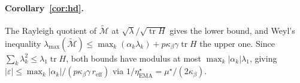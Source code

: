 \documentclass[11pt]{article}
\newcommand{\tr}{\operatorname{tr}}
\begin{document}
\paragraph{Corollary~\ref{cor:hd}.} The Rayleigh quotient of $\widetilde{\mathcal M}$ at $\sqrt\lambda/\sqrt{\tr H}$ gives the lower bound, and Weyl's inequality $\lambda_{\max}(\widetilde{\mathcal M})\le\max_k(\alpha_k\lambda_k)+p\kappa_\beta\gamma\tr H$ the upper one. Since $\sum_k\lambda_k^2\le\lambda_1\tr H$, both bounds have modulus at most $\max_k|\alpha_k|\lambda_1$, giving $|\varepsilon|\le\max_k|\alpha_k|/(p\kappa_\beta\gamma\,r_{\mathrm{eff}})$ via $1/\eta^\star_{\mathrm{EMA}}=\mu^\star/(2\kappa_\beta)$.

\endgroup
\renewcommand{\bibfont}{\footnotesize}\setlength{\bibsep}{0pt}


\end{document}

